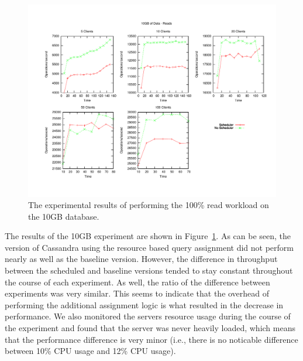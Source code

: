 \begin{figure}[t]
\centering
\includegraphics[scale=0.563]{images/10GB_Reads.pdf}
\vspace{-15pt}
\caption{The experimental results of performing the 100\% read workload on the 10GB database.}
\label{fig:10g_reads}
\end{figure}

The results of the 10GB experiment are shown in Figure~\ref{fig:10g_reads}. As can be seen, the version of Cassandra using the resource based query assignment did not perform nearly as well as the baseline version. However, the difference in throughput between the scheduled and baseline versions tended to stay constant throughout the course of each experiment. As well, the ratio of the difference between experiments was very similar. This seems to indicate that the overhead of performing the additional assignment logic is what resulted in the decrease in performance. We also monitored the servers resource usage during the course of the experiment and found that the server was never heavily loaded, which means that the performance difference is very minor (i.e., there is no noticable difference between 10\% CPU usage and 12\% CPU usage).

